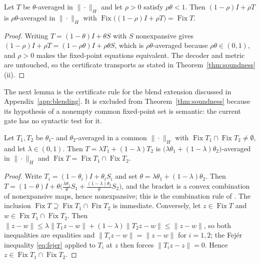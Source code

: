 \begin{lemma}[Relaxation]
\label{lem:relaxation}
Let $T$ be $\theta$-averaged in $\|\cdot\|_H$ and let $\rho>0$ satisfy
$\rho\theta<1$. Then $(1-\rho)I+\rho T$ is $\rho\theta$-averaged in
$\|\cdot\|_H$ with $\operatorname{Fix}\bigl((1-\rho)I+\rho
T\bigr)=\operatorname{Fix}T$.
\end{lemma}

\begin{proof}
Writing $T=(1-\theta)I+\theta S$ with $S$ nonexpansive gives
$(1-\rho)I+\rho T=(1-\rho\theta)I+\rho\theta S$, which is
$\rho\theta$-averaged because $\rho\theta\in(0,1)$, and $\rho>0$ makes the
fixed-point equations equivalent. The decoder and metric are untouched, so
the certificate transports as stated in Theorem~\ref{thm:soundness}(ii).
\end{proof}

The next lemma is the certificate rule for the blend extension discussed in
Appendix~\ref{app:blending}. It is excluded from
Theorem~\ref{thm:soundness} because its hypothesis of a nonempty common
fixed-point set is semantic: the current gate has no syntactic test for it.

\begin{lemma}[Blends]
\label{lem:blend}
Let $T_1,T_2$ be $\theta_1$- and $\theta_2$-averaged in a common
$\|\cdot\|_H$ with
$\operatorname{Fix}T_1\cap\operatorname{Fix}T_2\neq\emptyset$, and let
$\lambda\in(0,1)$. Then $T=\lambda T_1+(1-\lambda)T_2$ is
$\bigl(\lambda\theta_1+(1-\lambda)\theta_2\bigr)$-averaged in $\|\cdot\|_H$
and $\operatorname{Fix}T=\operatorname{Fix}T_1\cap\operatorname{Fix}T_2$.
\end{lemma}

\begin{proof}
Write $T_i=(1-\theta_i)I+\theta_iS_i$ and set
$\theta=\lambda\theta_1+(1-\lambda)\theta_2$. Then
$T=(1-\theta)I+\theta\bigl(\tfrac{\lambda\theta_1}{\theta}S_1
+\tfrac{(1-\lambda)\theta_2}{\theta}S_2\bigr)$, and the bracket is a convex
combination of nonexpansive maps, hence nonexpansive; this is the
combination rule of \citet{CombettesYamada2015Compositions}. The inclusion
$\operatorname{Fix}T\supseteq\operatorname{Fix}T_1\cap\operatorname{Fix}T_2$
is immediate. Conversely, let $z\in\operatorname{Fix}T$ and
$w\in\operatorname{Fix}T_1\cap\operatorname{Fix}T_2$. Then
$\|z-w\|\leq\lambda\|T_1z-w\|+(1-\lambda)\|T_2z-w\|\leq\|z-w\|$, so both
inequalities are equalities and $\|T_iz-w\|=\|z-w\|$ for $i=1,2$; the
Fej\'er inequality \eqref{eq:fejer} applied to $T_i$ at $z$ then forces
$\|T_iz-z\|=0$. Hence $z\in\operatorname{Fix}T_1\cap\operatorname{Fix}T_2$.
\end{proof}

